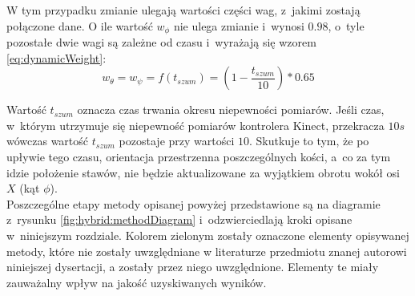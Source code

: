 																
W tym przypadku zmianie ulegają wartości części wag, z~jakimi zostają połączone dane. O ile wartość $w_\phi$ nie ulega zmianie i~wynosi $0.98$, o~tyle pozostałe dwie wagi są zależne od czasu i~wyrażają się wzorem \ref{eq:dynamicWeight}:
\begin{equation}
	w_{\theta} = w_{\psi} = f(t_{szum}) = (1-\frac{t_{szum}}{10}) * 0.65
	\label{eq:dynamicWeight}
\end{equation}
																
Wartość $t_{szum}$ oznacza czas trwania okresu niepewności pomiarów. Jeśli czas, w~którym utrzymuje się niepewność pomiarów kontrolera Kinect, przekracza $10s$ wówczas wartość $t_{szum}$ pozostaje przy wartości $10$. Skutkuje to tym, że po upływie tego czasu, orientacja przestrzenna poszczególnych kości, a~co za tym idzie położenie stawów, nie będzie aktualizowane za wyjątkiem obrotu wokół osi $X$ (kąt $\phi$). \\
																

Poszczególne etapy metody opisanej powyżej przedstawione są na diagramie z~rysunku \ref{fig:hybrid:methodDiagram} i~odzwierciedlają kroki opisane w~niniejszym rozdziale. Kolorem zielonym zostały oznaczone elementy opisywanej metody, które nie zostały uwzględniane w literaturze przedmiotu znanej autorowi niniejszej dysertacji, a zostały przez niego uwzględnione. Elementy te miały zauważalny wpływ na jakość uzyskiwanych wyników.